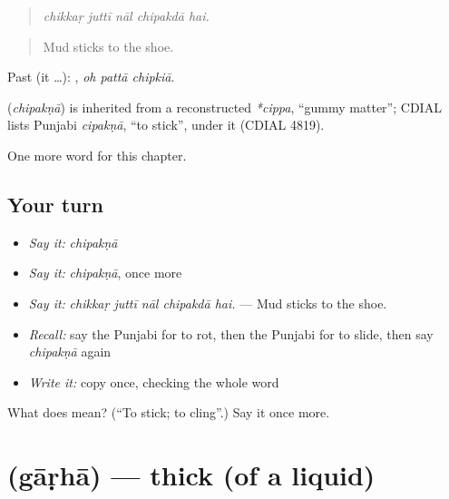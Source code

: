 \begin{quote}
    
\end{quote}

\begin{quote}
\emph{chikkaṛ juttī nāl chipakdā hai.}
\end{quote}

\begin{quote}
Mud sticks to the shoe.
\end{quote}

Past (it …):   , \emph{oh pattā chipkiā}.

\begin{cousinweb}
\textbf{} (\emph{chipakṇā}) is inherited from a reconstructed \emph{*cippa}, \textquotedblleft{}gummy matter\textquotedblright{}; CDIAL lists Punjabi \emph{cipakṇā}, \textquotedblleft{}to stick\textquotedblright{}, under it (CDIAL 4819).
\end{cousinweb}

\begin{grammarlens}[title={What you've built}]
One more word for this chapter.
\end{grammarlens}

\subsection*{Your turn}
\begin{itemize}
\raggedright
  \item \emph{Say it:} \emph{chipakṇā}
  \item \emph{Say it:} \emph{chipakṇā}, once more
  \item \emph{Say it:} \emph{chikkaṛ juttī nāl chipakdā hai.} — Mud sticks to the shoe.
  \item \emph{Recall:} say the Punjabi for to rot, then the Punjabi for to slide, then say \emph{chipakṇā} again
  \item \emph{Write it:} copy \textbf{} once, checking the whole word
\end{itemize}

\begin{tcolorbox}[breakable,colback=teal!4,colframe=teal!35!black,title={Before you move on}]
What does  mean? (\textquotedblleft{}To stick; to cling\textquotedblright{}.) Say it once more.
\end{tcolorbox}
\section[\texorpdfstring{\pa{ਗਾੜ੍ਹਾ} (gāṛhā)}{ਗਾੜ੍ਹਾ (gāṛhā)}]{ (gāṛhā) — thick (of a liquid)}

